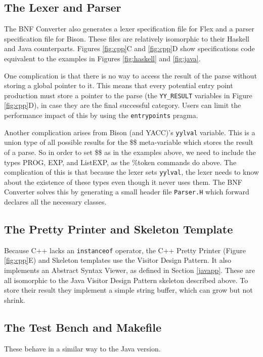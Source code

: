 \documentclass{llncs}
\begin{document}
\subsection{The Lexer and Parser}
The BNF Converter also generates a lexer specification file for Flex and a parser specification file for Bison. These files are relatively isomorphic to their Haskell and Java counterparts.
Figures \ref{fig:cpp}C and \ref{fig:cpp}D show specifications code equivalent to the examples in Figures \ref{fig:haskell} and \ref{fig:java}.

One complication is that there is no way to access the result of the parse without storing a global pointer to it. This means that every potential entry point production must store a pointer to the parse (the \texttt{YY\_RESULT} variables in Figure \ref{fig:cpp}D), in case they are the final successful category. Users can limit the performance impact of this by using the \texttt{entrypoints} pragma.

Another complication arises from Bison (and YACC)'s \texttt{yylval} variable. This is a union type of all possible results for the \$\$ meta-variable which stores the result of a parse. So in order to set \$\$ as in the examples above, we need to include the types PROG, EXP, and ListEXP, as the \%token commands do above. The complication of this is that because the lexer sets \texttt{yylval}, the lexer needs to know about the existence of these types even though it never uses them. The BNF Converter solves this by generating a small header file \texttt{Parser.H} which forward declares all the necessary classes.

\subsection{The Pretty Printer and Skeleton Template}
Because C++ lacks an \texttt{instanceof} operator, the C++ Pretty Printer (Figure \ref{fig:cpp}E) and Skeleton templates use the Visitor Design Pattern. It also implements an Abstract Syntax Viewer, as defined in Section \ref{javapp}. These are all isomorphic to the Java Visitor Design Pattern skeleton described above. To store their result they implement a simple string buffer, which can grow but not shrink.

\subsection{The Test Bench and Makefile}

These behave in a similar way to the Java version.
\end{document}
